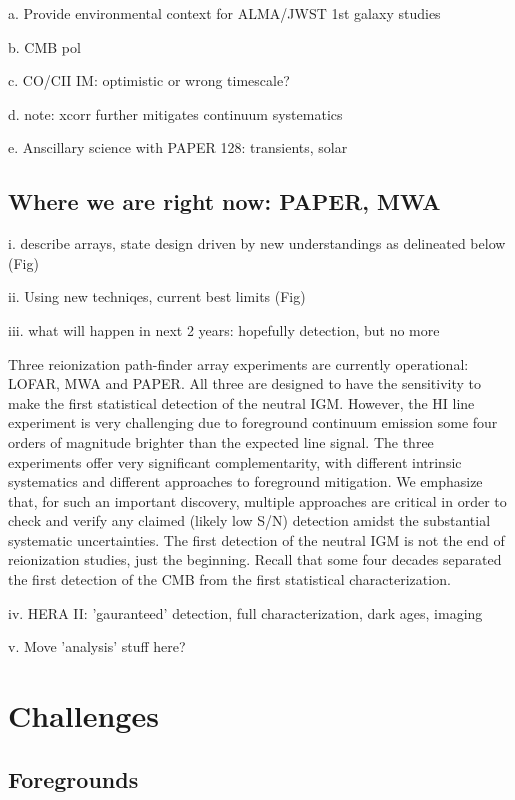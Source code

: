 \documentclass[preprint]{aastex}
\begin{document}
a. Provide environmental context for ALMA/JWST 1st galaxy studies

b. CMB pol 

c. CO/CII IM: optimistic or wrong timescale?
  
d. note: xcorr further mitigates continuum systematics

e. Anscillary science with PAPER 128: transients, solar 

\subsection{Where we are right now: PAPER, MWA}  %

i. describe arrays, state design driven by new understandings as delineated below (Fig)

ii. Using new techniqes, current best limits  (Fig)

iii. what will happen in next 2 years: hopefully detection, but no more

Three reionization path-finder array experiments are currently
operational: LOFAR, MWA and PAPER. All three are designed to have the
sensitivity to make the first statistical detection of the neutral
IGM. However, the HI line experiment is very challenging due to
foreground continuum emission some four orders of magnitude brighter
than the expected line signal.  The three experiments offer very
significant complementarity, with different intrinsic systematics and
different approaches to foreground mitigation. We emphasize that, for
such an important discovery, multiple approaches are critical in order
to check and verify any claimed (likely low S/N) detection amidst the
substantial systematic uncertainties. The first detection of
the neutral IGM is not the end of reionization studies, just the 
beginning. Recall that some four decades separated the first detection
of the CMB from the first statistical characterization. 


iv. HERA II: 'gauranteed' detection, full characterization, dark ages, imaging

v. Move 'analysis' stuff here?


\section{Challenges} %

\subsection{Foregrounds}  %
\end{document}
